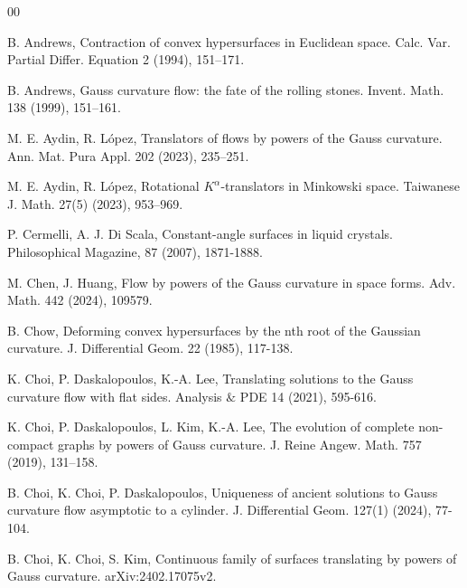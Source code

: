 \documentclass[12pt]{amsart}
\theoremstyle{definition}
\begin{document}
\begin{thebibliography}{00}

 B. Andrews, Contraction of convex hypersurfaces in Euclidean space. Calc. Var. Partial Differ. Equation 2  (1994), 151--171.


  B. Andrews, Gauss curvature flow: the fate of the rolling stones. Invent. Math. 138  (1999), 151--161.



  M. E. Aydin, R. L\'opez, Translators of flows by powers of the Gauss curvature. Ann. Mat. Pura Appl. 202 (2023), 235–251.

  M. E. Aydin, R. L\'opez, Rotational $K^\alpha$-translators in Minkowski space. Taiwanese J. Math. 27(5) (2023), 953–969.

 P. Cermelli, A. J. Di Scala, Constant-angle surfaces in liquid crystals. Philosophical Magazine, 87 (2007), 1871-1888.

 M. Chen, J. Huang, Flow by powers of the Gauss curvature in space forms. Adv. Math. 442 (2024), 109579.

 B. Chow, Deforming convex hypersurfaces by the nth root of the Gaussian curvature.  J. Differential Geom. 22   (1985), 117-138.

  K. Choi, P. Daskalopoulos, K.-A. Lee, Translating solutions to the Gauss curvature flow with flat sides. Analysis $\&$ PDE 14  (2021), 595-616.

  K. Choi, P. Daskalopoulos, L. Kim, K.-A. Lee, The evolution of complete non-compact graphs by powers of Gauss curvature. J. Reine Angew. Math. 757 (2019), 131–158.

 B. Choi, K. Choi, P. Daskalopoulos, Uniqueness of ancient solutions to Gauss curvature flow asymptotic to a cylinder. J. Differential Geom. 127(1) (2024), 77-104.

 B. Choi, K. Choi, S. Kim, Continuous family of surfaces translating by powers of Gauss curvature. arXiv:2402.17075v2.


\end{thebibliography}
\end{document}
